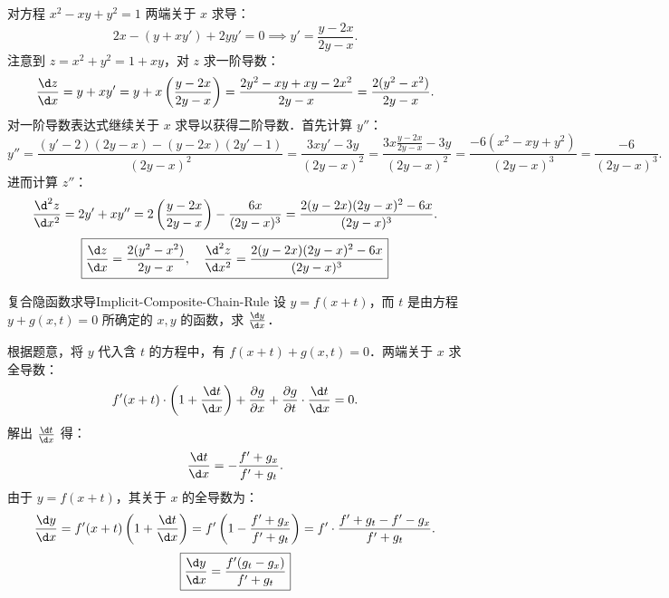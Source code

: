 \begin{solution}
    对方程 $x^2 - xy + y^2 = 1$ 两端关于 $x$ 求导：
    \begin{equation}
        2x - (y + x y') + 2yy' = 0 \implies y' = \frac{y - 2x}{2y - x}.
    \end{equation}
    注意到 $z = x^2 + y^2 = 1 + xy$，对 $z$ 求一阶导数：
    \begin{equation}
        \frac{\d z}{\d x} = y + xy' = y + x \left( \frac{y - 2x}{2y - x} \right) = \frac{2y^2 - xy + xy - 2x^2}{2y - x} = \frac{2(y^2 - x^2)}{2y - x}.
    \end{equation}
    对一阶导数表达式继续关于 $x$ 求导以获得二阶导数．首先计算 $y''$：
    \begin{equation}
        y'' = \frac{(y' - 2)(2y - x) - (y - 2x)(2y' - 1)}{(2y - x)^2} = \frac{3xy' - 3y}{(2y - x)^2} = \frac{3x\frac{y - 2x}{2y - x} - 3y}{(2y - x)^2} = \frac{-6(x^2 - xy + y^2)}{(2y - x)^3} = \frac{-6}{(2y - x)^3}.
    \end{equation}
    进而计算 $z''$：
    \begin{equation}
        \frac{\d^2 z}{\d x^2} = 2y' + xy'' = 2 \left( \frac{y - 2x}{2y - x} \right) - \frac{6x}{(2y - x)^3} = \frac{2(y - 2x)(2y - x)^2 - 6x}{(2y - x)^3}.
    \end{equation}
    \begin{equation}
        \boxed{\frac{\d z}{\d x} = \frac{2(y^2 - x^2)}{2y - x}, \quad \frac{\d^2 z}{\d x^2} = \frac{2(y - 2x)(2y - x)^2 - 6x}{(2y - x)^3}}
    \end{equation}
\end{solution}

\begin{problem}{复合隐函数求导}{Implicit-Composite-Chain-Rule}
    设 $y = f(x + t)$，而 $t$ 是由方程 $y + g(x, t) = 0$ 所确定的 $x, y$ 的函数，求 $\frac{\d y}{\d x}$．
\end{problem}

\begin{solution}
    根据题意，将 $y$ 代入含 $t$ 的方程中，有 $f(x + t) + g(x, t) = 0$．两端关于 $x$ 求全导数：
    \begin{equation}
        f'(x + t) \cdot \left( 1 + \frac{\d t}{\d x} \right) + \frac{\partial g}{\partial x} + \frac{\partial g}{\partial t} \cdot \frac{\d t}{\d x} = 0. \label{eq:total-diff}
    \end{equation}
    解出 $\frac{\d t}{\d x}$ 得：
    \begin{equation}
        \frac{\d t}{\d x} = -\frac{f' + g_x}{f' + g_t}.
    \end{equation}
    由于 $y = f(x + t)$，其关于 $x$ 的全导数为：
    \begin{equation}
        \frac{\d y}{\d x} = f'(x + t) \left( 1 + \frac{\d t}{\d x} \right) = f' \left( 1 - \frac{f' + g_x}{f' + g_t} \right) = f' \cdot \frac{f' + g_t - f' - g_x}{f' + g_t}.
    \end{equation}
    \begin{equation}
        \boxed{\frac{\d y}{\d x} = \frac{f'(g_t - g_x)}{f' + g_t}}
    \end{equation}
\end{solution}

